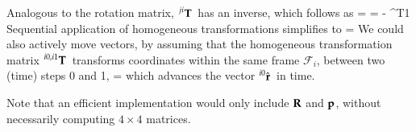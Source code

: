 Analogous to the rotation matrix, $\prescript{ji}{}{\mathbf{T}}\,$ has an inverse, which follows as
\be
   =  =  {- }{\Null^T}{1}  \eqDot
\ee
Sequential application of homogeneous transformations simplifies to
\be
   =   \eqDot
\ee
We could also actively move vectors, by assuming that the homogeneous transformation matrix $\prescript{i0,i1}{}{\mathbf{T}}\,$ transforms coordinates within the same frame $\mathcal{F}_i$, between two (time) steps 0 and 1,
\be
   =  
\ee
which advances the vector $\prescript{i0}{}{\hat {\mathbf{r}}}\,$ in time.

Note that an efficient implementation would only include $\mathbf{R}$ and $\mathbf{p}$, without necessarily computing $4 \times 4$ matrices.

